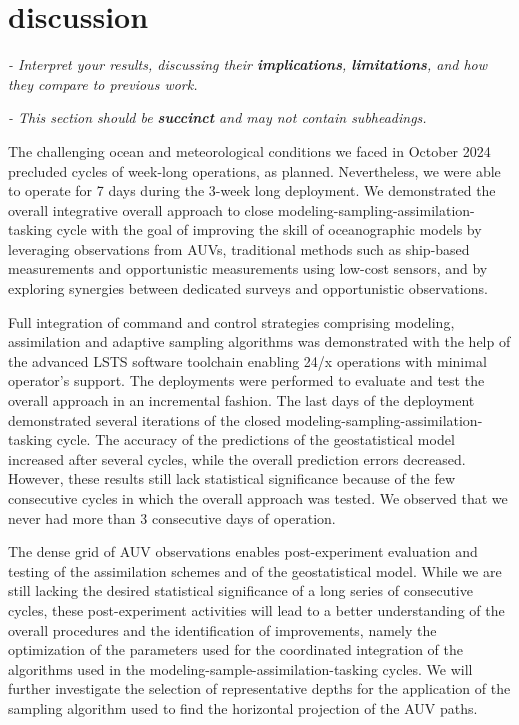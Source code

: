 \section{discussion}

\textit{- Interpret your results, discussing their
  \textbf{implications}, \textbf{limitations}, and how they compare to
  previous work.}

\textit{- This section should be \textbf{succinct} and may not contain subheadings.}

The challenging ocean and meteorological conditions we faced in October
2024 precluded cycles of week-long operations, as planned. Nevertheless,
we were able to operate for 7 days during the 3-week long deployment. We
demonstrated the overall integrative overall approach to close
modeling-sampling-assimilation-tasking cycle with the goal of improving
the skill of oceanographic models by leveraging observations from AUVs,
traditional methods such as ship-based measurements and opportunistic
measurements using low-cost sensors, and by exploring synergies between
dedicated surveys and opportunistic observations.

Full integration of command and control strategies comprising modeling,
assimilation and adaptive sampling algorithms was demonstrated with the
help of the advanced LSTS software toolchain enabling 24/x operations
with minimal operator’s support. The deployments were performed to
evaluate and test the overall approach in an incremental fashion. The
last days of the deployment demonstrated several iterations of the
closed modeling-sampling-assimilation-tasking cycle. The accuracy of the
predictions of the geostatistical model increased after several cycles,
while the overall prediction errors decreased. However, these results
still lack statistical significance because of the few consecutive
cycles in which the overall approach was tested. We observed that we
never had more than 3 consecutive days of operation.

The dense grid of AUV observations enables post-experiment evaluation
and testing of the assimilation schemes and of the geostatistical model.
While we are still lacking the desired statistical significance of a
long series of consecutive cycles, these post-experiment activities will
lead to a better understanding of the overall procedures and the
identification of improvements, namely the optimization of the
parameters used for the coordinated integration of the algorithms used
in the modeling-sample-assimilation-tasking cycles. We will further
investigate the selection of representative depths for the application
of the sampling algorithm used to find the horizontal projection of the
AUV paths.


